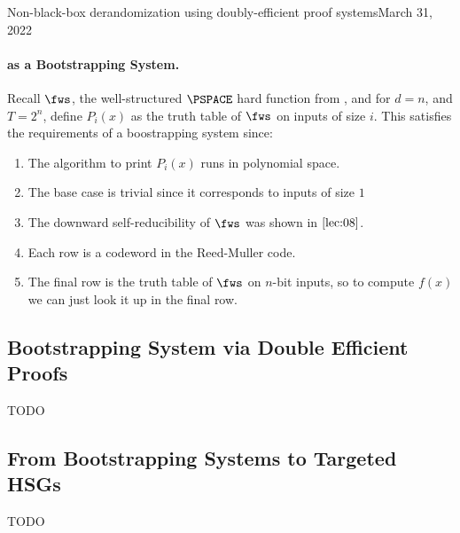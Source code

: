 \begin{lecture}{10}{Non-black-box derandomization using doubly-efficient proof
  systems}{March 31, 2022}
\paragraph{ as a Bootstrapping System.}
Recall $\fws$, the well-structured $\PSPACE$ hard function from ,
and for $d = n$, and $T = 2^n$, define $P_i(x)$ as the truth table of $\fws$
on inputs of size $i$.
This satisfies the requirements of a boostrapping system since:
\begin{enumerate}
  \item The algorithm to print $P_i(x)$ runs in polynomial space.
  \item The base case is trivial since it corresponds to inputs of size $1$
  \item The downward self-reducibility of $\fws$ was shown in $\Cref{lec:08}$.
  \item Each row is a codeword in the Reed-Muller code.
  \item The final row is the truth table of $\fws$ on $n$-bit inputs, so
    to compute $f(x)$ we can just look it up in the final row.
\end{enumerate}

\subsection{Bootstrapping System via Double Efficient Proofs}
TODO

\subsection{From Bootstrapping Systems to Targeted HSGs}
TODO

\end{lecture}
